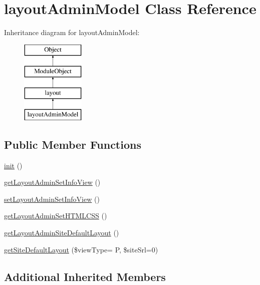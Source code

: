 \hypertarget{classlayoutAdminModel}{}\section{layout\+Admin\+Model Class Reference}
\label{classlayoutAdminModel}
Inheritance diagram for layout\+Admin\+Model\+:\begin{figure}[H]
\begin{center}
\leavevmode
\includegraphics[height=4.000000cm]{classlayoutAdminModel}
\end{center}
\end{figure}
\subsection*{Public Member Functions}
\begin{DoxyCompactItemize}
\item 
\hyperlink{classlayoutAdminModel_aeb0c45993a600a2e3f72bd0a79c3adc7}{init} ()
\item 
\hyperlink{classlayoutAdminModel_a7171578a8c44846e96b6330378152ddd}{get\+Layout\+Admin\+Set\+Info\+View} ()
\item 
\hyperlink{classlayoutAdminModel_a5d53a19d62ff5fcbd2cc604e3d6a8e29}{set\+Layout\+Admin\+Set\+Info\+View} ()
\item 
\hyperlink{classlayoutAdminModel_a5757eaff4093fe8a359b4f3b5a6a2bff}{get\+Layout\+Admin\+Set\+H\+T\+M\+L\+C\+S\+S} ()
\item 
\hyperlink{classlayoutAdminModel_a1fb703fe8ebe3ced1f904d3a1d645532}{get\+Layout\+Admin\+Site\+Default\+Layout} ()
\item 
\hyperlink{classlayoutAdminModel_af2e53398a6068a4652567b922dfce4b1}{get\+Site\+Default\+Layout} (\$view\+Type= \textquotesingle{}P\textquotesingle{}, \$site\+Srl=0)
\end{DoxyCompactItemize}
\subsection*{Additional Inherited Members}


